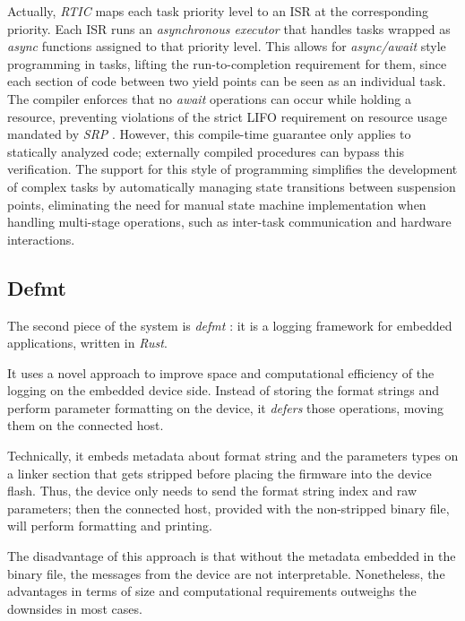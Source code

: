 Actually, \textit{RTIC} maps each task priority level to an ISR at the
corresponding priority. Each ISR runs an \textit{asynchronous executor} that
handles tasks wrapped as \textit{async} functions assigned to that priority
level. This allows for \textit{async/await} style programming in tasks, lifting
the run-to-completion requirement for them, since each section of code between
two yield points can be seen as an individual task. The compiler enforces that
no \textit{await} operations can occur while holding a resource, preventing
violations of the strict LIFO requirement on resource usage mandated by
\textit{SRP} \cite{RticrsRtic2025}. However, this compile-time guarantee only
applies to statically analyzed code; externally compiled procedures can bypass
this verification. The support for this style of programming simplifies the
development of complex tasks by automatically managing state transitions between
suspension points, eliminating the need for manual state machine implementation
when handling multi-stage operations, such as inter-task communication and
hardware interactions. 
\label{lab:compiler-checks-on-await}

\subsection{Defmt}

The second piece of the system is \textit{defmt} \cite{IntroductionDefmtBook}:
it is a logging framework for embedded applications, written in \textit{Rust}. 

It uses a novel approach to improve space and computational efficiency of the
logging on the embedded device side. Instead of storing the format strings and
perform parameter formatting on the device, it \textit{defers} those operations,
moving them on the connected host. 

Technically, it embeds metadata about format string and the parameters types on
a linker section that gets stripped before placing the firmware into the device
flash. Thus, the device only needs to send the format string index and raw
parameters; then the connected host, provided with the non-stripped binary file,
will perform formatting and printing. 

The disadvantage of this approach is that without the metadata embedded in the
binary file, the messages from the device are not interpretable. Nonetheless,
the advantages in terms of size and computational requirements outweighs the
downsides in most cases. 

